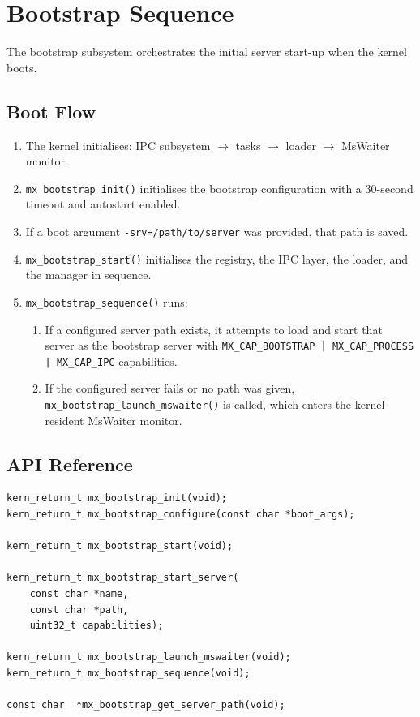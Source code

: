 \documentclass[a4paper,11pt]{article}
\begin{document}
\section{Bootstrap Sequence}

The bootstrap subsystem orchestrates the initial server start-up
when the kernel boots.

\subsection{Boot Flow}

\begin{enumerate}
  \item The kernel initialises: IPC subsystem $\rightarrow$ tasks
    $\rightarrow$ loader $\rightarrow$ MsWaiter monitor.
  \item \texttt{mx\_bootstrap\_init()} initialises the bootstrap
    configuration with a 30-second timeout and autostart enabled.
  \item If a boot argument \texttt{-srv=/path/to/server} was
    provided, that path is saved.
  \item \texttt{mx\_bootstrap\_start()} initialises the registry,
    the IPC layer, the loader, and the manager in sequence.
  \item \texttt{mx\_bootstrap\_sequence()} runs:
    \begin{enumerate}
      \item If a configured server path exists, it attempts to load
        and start that server as the bootstrap server with
        \texttt{MX\_CAP\_BOOTSTRAP | MX\_CAP\_PROCESS | MX\_CAP\_IPC}
        capabilities.
      \item If the configured server fails or no path was given,
        \texttt{mx\_bootstrap\_launch\_mswaiter()} is called,
        which enters the kernel-resident MsWaiter monitor.
    \end{enumerate}
\end{enumerate}

\subsection{API Reference}

\begin{lstlisting}
kern_return_t mx_bootstrap_init(void);
kern_return_t mx_bootstrap_configure(const char *boot_args);

kern_return_t mx_bootstrap_start(void);

kern_return_t mx_bootstrap_start_server(
    const char *name,
    const char *path,
    uint32_t capabilities);

kern_return_t mx_bootstrap_launch_mswaiter(void);
kern_return_t mx_bootstrap_sequence(void);

const char  *mx_bootstrap_get_server_path(void);
\end{lstlisting}
\end{document}
